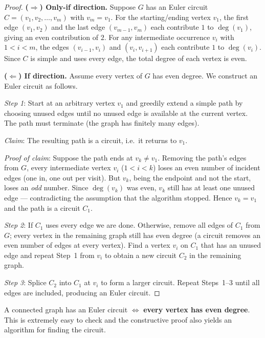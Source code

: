 \documentclass[11pt, a4paper, notitlepage]{report}
\theoremstyle{definition}
\theoremstyle{remark}
\begin{document}
\begin{proof}
\textbf{($\Rightarrow$) Only-if direction.}
Suppose $G$ has an Euler circuit $C = (v_1, v_2, \dots, v_m)$ with $v_m = v_1$. For the
starting/ending vertex $v_1$, the first edge $(v_1, v_2)$ and the last edge $(v_{m-1}, v_m)$
each contribute $1$ to $\deg(v_1)$, giving an even contribution of $2$. For any intermediate
occurrence $v_i$ with $1 < i < m$, the edges $(v_{i-1}, v_i)$ and $(v_i, v_{i+1})$ each
contribute $1$ to $\deg(v_i)$. Since $C$ is simple and uses every edge, the total degree of
each vertex is even.

\medskip
\textbf{($\Leftarrow$) If direction.}
Assume every vertex of $G$ has even degree. We construct an Euler circuit as follows.

\emph{Step 1}: Start at an arbitrary vertex $v_1$ and greedily extend a simple path by choosing
unused edges until no unused edge is available at the current vertex. The path must terminate
(the graph has finitely many edges).

\emph{Claim}: The resulting path is a circuit, i.e.\ it returns to $v_1$.

\emph{Proof of claim}: Suppose the path ends at $v_k \ne v_1$. Removing the path's edges from
$G$, every intermediate vertex $v_i$ ($1 < i < k$) loses an even number of incident edges
(one in, one out per visit). But $v_k$, being the endpoint and not the start, loses an
\emph{odd} number. Since $\deg(v_k)$ was even, $v_k$ still has at least one unused edge ---
contradicting the assumption that the algorithm stopped. Hence $v_k = v_1$ and the path is a
circuit $C_1$.

\emph{Step 2}: If $C_1$ uses every edge we are done. Otherwise, remove all edges of $C_1$ from
$G$; every vertex in the remaining graph still has even degree (a circuit removes an even
number of edges at every vertex). Find a vertex $v_i$ on $C_1$ that has an unused edge and
repeat Step~1 from $v_i$ to obtain a new circuit $C_2$ in the remaining graph.

\emph{Step 3}: Splice $C_2$ into $C_1$ at $v_i$ to form a larger circuit. Repeat Steps~1--3
until all edges are included, producing an Euler circuit.
\end{proof}

\begin{keyresult}[title={Key Result: Euler Circuit Test}]
A connected graph has an Euler circuit $\iff$ \textbf{every vertex has even degree}.
This is extremely easy to check and the constructive proof also yields an algorithm for
finding the circuit.
\end{keyresult}
\end{document}
